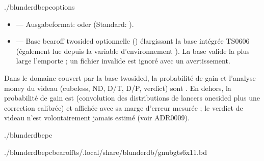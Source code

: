 \documentclass[letterpaper,10pt,german]{sphinxmanual}
\begin{document}
\begin{sphinxVerbatim}[commandchars=\\\{\}]
./blunderdbepc\PYG{o}{[}options\PYG{o}{]}
\end{sphinxVerbatim}

\sphinxAtStartPar
{}
\begin{itemize}
\item {} 
\sphinxAtStartPar
{} — Ausgabeformat:  oder  (Standard: ).

\item {} 
\sphinxAtStartPar
{} — Base bearoff two\sphinxhyphen{}sided optionnelle () élargissant
la base intégrée TS\sphinxhyphen{}06\sphinxhyphen{}06 (également lue depuis la variable d’environnement
). La base valide la plus large l’emporte ; un fichier
invalide est ignoré avec un avertissement.

\end{itemize}

\sphinxAtStartPar
{} Dans le domaine couvert par la base two\sphinxhyphen{}sided, la probabilité de
gain et l’analyse money du videau (cubeless, ND, D/T, D/P, verdict) sont
. En dehors, la probabilité de gain est  (convolution
des distributions de lancers one\sphinxhyphen{}sided plus une correction calibrée) et
affichée avec sa marge d’erreur mesurée ; le verdict de videau n’est
volontairement jamais estimé (voir ADR\sphinxhyphen{}0009).

\sphinxAtStartPar
{}

\begin{sphinxVerbatim}[commandchars=\\\{\}]
./blunderdbepc

./blunderdbepc\PYGZhy{}\PYGZhy{}bearoff\PYGZhy{}ts\PYGZti{}/.local/share/blunderdb/gnubg\PYGZus{}ts6x11.bd
\end{sphinxVerbatim}
\end{document}
